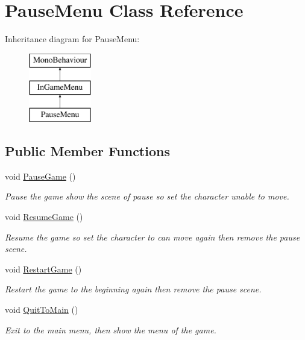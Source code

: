 \hypertarget{class_pause_menu}{}\section{Pause\+Menu Class Reference}
\label{class_pause_menu}
Inheritance diagram for Pause\+Menu\+:\begin{figure}[H]
\begin{center}
\leavevmode
\includegraphics[height=3.000000cm]{class_pause_menu}
\end{center}
\end{figure}
\subsection*{Public Member Functions}
\begin{DoxyCompactItemize}
\item 
void \hyperlink{class_pause_menu_a2b86ff433ae3df8d0a717f3daa72943b}{Pause\+Game} ()
\begin{DoxyCompactList}\small\item\em Pause the game show the scene of pause so set the character unable to move. \end{DoxyCompactList}\item 
void \hyperlink{class_pause_menu_a505c44b23587b6e53c7b89813337576b}{Resume\+Game} ()
\begin{DoxyCompactList}\small\item\em Resume the game so set the character to can move again then remove the pause scene. \end{DoxyCompactList}\item 
void \hyperlink{class_pause_menu_a332ac40e332e7fab5f8f457f1acc1961}{Restart\+Game} ()
\begin{DoxyCompactList}\small\item\em Restart the game to the beginning again then remove the pause scene. \end{DoxyCompactList}\item 
void \hyperlink{class_pause_menu_ac78f101fedf5cda06a5b51bb87411737}{Quit\+To\+Main} ()
\begin{DoxyCompactList}\small\item\em Exit to the main menu, then show the menu of the game. \end{DoxyCompactList}\end{DoxyCompactItemize}
